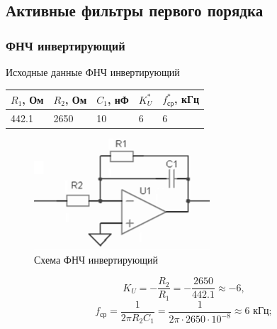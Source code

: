 \documentclass[a4paper, 12pt]{article}
\begin{document}
    \subsection{Активные фильтры первого порядка}
    \subsubsection{ФНЧ инвертирующий} \label{sec:lpinv}
    Исходные данные ФНЧ инвертирующий
    \begin{center}
        \begin{tabular}{ | m{3.5em} | m{3.5em}| m{3.5em} | m{2.5em} | m{3.5em} |} 
        \hline
        $R_1$, Ом& $R_2$, Ом &$C_1$, нФ &$K_U^*$ &$f_\text{ср}^*$, кГц\\ 
        \hline
        442.1& 2650 & 10 &6 &6\\ 
        \hline
        \end{tabular}
    \end{center}
    \begin{figure}[H]
        \centering
        \includegraphics{low_pass_m.png}
        \captionsetup{skip=0pt}
        \caption{Схема ФНЧ инвертирующий}
        \label{fig:null_scheme1}
    \end{figure}
    $$
    K_U=-\dfrac{R_2}{R_1}=-\dfrac{2650}{442.1}\approx-6,
    $$
    $$
    f_\text{ср}=\dfrac{1}{2\pi R_2C_1}=\dfrac{1}{2\pi\cdot2650\cdot10^{-8}}\approx6\text{ кГц};
    $$
\end{document}
